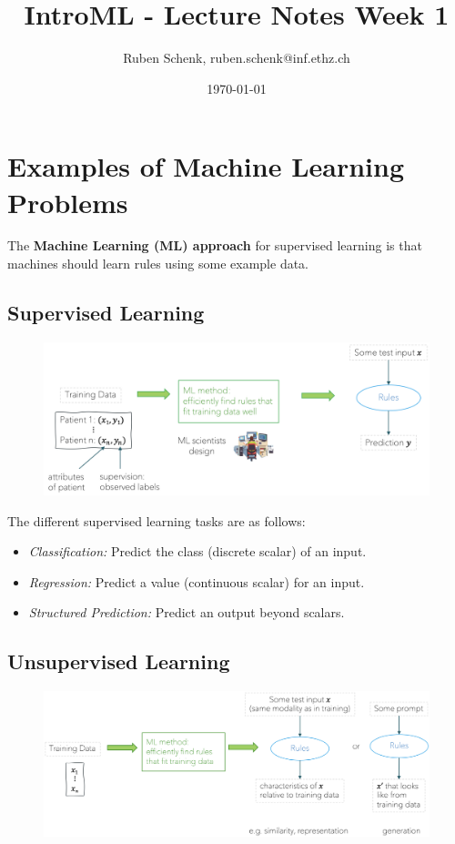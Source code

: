 \documentclass[a4paper]{extarticle}
\title{IntroML - Lecture Notes Week 1}
\author{Ruben Schenk, ruben.schenk@inf.ethz.ch}
\date{\today}
\begin{document}
\maketitle
\newpage

\section{Examples of Machine Learning Problems}

\begin{ebox}
The \textbf{Machine Learning (ML) approach} for supervised learning is that machines should learn rules using some example data.
\end{ebox}

\subsection{Supervised Learning}

\begin{figure}[H]
\includegraphics[width=15cm]{../images/IntroML_Fig1-1}
\centering
\end{figure}

The different supervised learning tasks are as follows:

\begin{itemize}
	\item \textit{Classification:} Predict the class (discrete scalar) of an input.
	\item \textit{Regression:} Predict a value (continuous scalar) for an input.
	\item \textit{Structured Prediction:} Predict an output beyond scalars.
\end{itemize}

\subsection{Unsupervised Learning}

\begin{figure}[H]
\includegraphics[width=15cm]{../images/IntroML_Fig1-2}
\centering
\end{figure}
\end{document}
